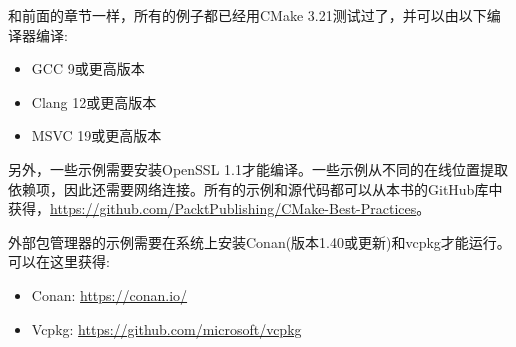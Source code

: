 和前面的章节一样，所有的例子都已经用CMake 3.21测试过了，并可以由以下编译器编译:

\begin{itemize}
\item 
GCC 9或更高版本

\item 
Clang 12或更高版本

\item 
MSVC 19或更高版本
\end{itemize}

另外，一些示例需要安装OpenSSL 1.1才能编译。一些示例从不同的在线位置提取依赖项，因此还需要网络连接。所有的示例和源代码都可以从本书的GitHub库中获得，\url{https://github.com/PacktPublishing/CMake-Best-Practices}。

外部包管理器的示例需要在系统上安装Conan(版本1.40或更新)和vcpkg才能运行。可以在这里获得:

\begin{itemize}
\item 
Conan: \url{https://conan.io/}

\item 
Vcpkg: \url{https://github.com/microsoft/vcpkg}
\end{itemize}
































